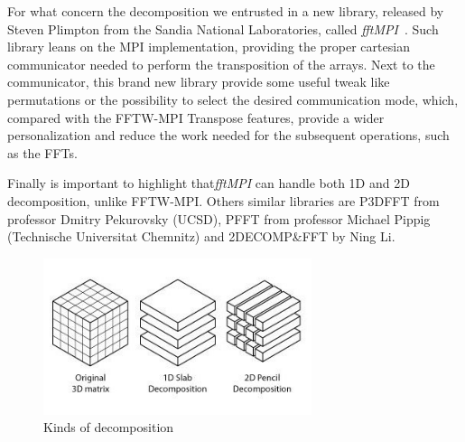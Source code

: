 \par
For what concern the decomposition we entrusted in a new library, released by Steven Plimpton from the Sandia National Laboratories, called \emph{fftMPI}~\cite{fftMPI}. Such library leans on the MPI implementation, providing the proper cartesian communicator needed to perform the transposition of the arrays. Next to the communicator, this brand new library provide some useful tweak like permutations or the possibility to select the desired communication mode, which, compared with the FFTW-MPI Transpose\cite{FFTW05}\cite{FFTW:transpose} features, provide a wider personalization and reduce the work needed for the subsequent operations, such as the FFTs. 
\par
Finally is important to highlight that\emph{fftMPI} can handle both 1D and 2D decomposition, unlike FFTW-MPI.
Others similar libraries are P3DFFT\cite{p3dfft} from professor Dmitry Pekurovsky (UCSD), PFFT from professor Michael Pippig\cite{pfft} (Technische Universitat Chemnitz) and 2DECOMP\&FFT\cite{2decomp} by Ning Li.

\begin{figure}
\begin{center}
\includegraphics[width=0.7\textwidth]{grafici/decomp_example}
\caption{Kinds of decomposition}
\label{decomposition:example}
\end{center}
\end{figure}




